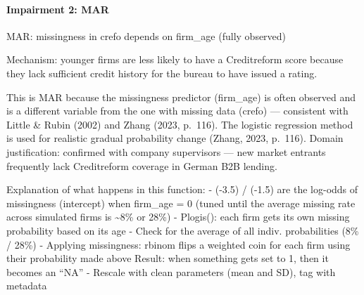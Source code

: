 \documentclass[
]{article}
\begin{document}
\paragraph{\texorpdfstring{\textbf{Impairment 2:
MAR}}{Impairment 2: MAR}}\label{impairment-2-mar}

MAR: missingness in crefo depends on firm\_age (fully observed)

Mechanism: younger firms are less likely to have a Creditreform score
because they lack sufficient credit history for the bureau to have
issued a rating.

This is MAR because the missingness predictor (firm\_age) is often
observed and is a different variable from the one with missing data
(crefo) --- consistent with Little \& Rubin (2002) and Zhang (2023,
p.~116). The logistic regression method is used for realistic gradual
probability change (Zhang, 2023, p.~116). Domain justification:
confirmed with company supervisors --- new market entrants frequently
lack Creditreform coverage in German B2B lending.

Explanation of what happens in this function: - (-3.5) / (-1.5) are the
log-odds of missingness (intercept) when firm\_age = 0 (tuned until the
average missing rate across simulated firms is \textasciitilde8\% or
28\%) - Plogis(): each firm gets its own missing probability based on
its age - Check for the average of all indiv. probabilities (8\% / 28\%)
- Applying missingness: rbinom flips a weighted coin for each firm using
their probability made above Result: when something gets set to 1, then
it becomes an ``NA'' - Rescale with clean parameters (mean and SD), tag
with metadata
\end{document}
